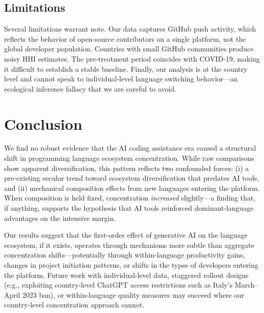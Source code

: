 \documentclass[12pt]{article}
\begin{document}
\subsection{Limitations}

Several limitations warrant note. Our data captures GitHub push activity, which reflects the behavior of open-source contributors on a single platform, not the global developer population. Countries with small GitHub communities produce noisy HHI estimates. The pre-treatment period coincides with COVID-19, making it difficult to establish a stable baseline. Finally, our analysis is at the country level and cannot speak to individual-level language switching behavior---an ecological inference fallacy that we are careful to avoid.

\section{Conclusion}

We find no robust evidence that the AI coding assistance era caused a structural shift in programming language ecosystem concentration. While raw comparisons show apparent diversification, this pattern reflects two confounded forces: (i) a pre-existing secular trend toward ecosystem diversification that predates AI tools, and (ii) mechanical composition effects from new languages entering the platform. When composition is held fixed, concentration \textit{increased} slightly---a finding that, if anything, supports the hypothesis that AI tools reinforced dominant-language advantages on the intensive margin.

Our results suggest that the first-order effect of generative AI on the language ecosystem, if it exists, operates through mechanisms more subtle than aggregate concentration shifts---potentially through within-language productivity gains, changes in project initiation patterns, or shifts in the types of developers entering the platform. Future work with individual-level data, staggered rollout designs (e.g., exploiting country-level ChatGPT access restrictions such as Italy's March--April 2023 ban), or within-language quality measures may succeed where our country-level concentration approach cannot.

\singlespacing


\clearpage
\appendix
\end{document}
